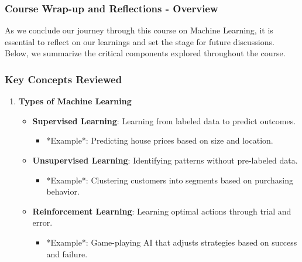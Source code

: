 \documentclass[aspectratio=169]{beamer}
\begin{document}
\frame{\titlepage}

\begin{frame}[fragile]
    \frametitle{Course Wrap-up and Reflections - Overview}
    As we conclude our journey through this course on Machine Learning,
    it is essential to reflect on our learnings and set the stage for future discussions.
    Below, we summarize the critical components explored throughout the course.
\end{frame}

\begin{frame}[fragile]
    \frametitle{Key Concepts Reviewed}
    \begin{enumerate}
        \item \textbf{Types of Machine Learning}
        \begin{itemize}
            \item \textbf{Supervised Learning}: Learning from labeled data to predict outcomes.
              \begin{itemize}
                  \item *Example*: Predicting house prices based on size and location.
              \end{itemize}
            \item \textbf{Unsupervised Learning}: Identifying patterns without pre-labeled data.
              \begin{itemize}
                  \item *Example*: Clustering customers into segments based on purchasing behavior.
              \end{itemize}
            \item \textbf{Reinforcement Learning}: Learning optimal actions through trial and error.
              \begin{itemize}
                  \item *Example*: Game-playing AI that adjusts strategies based on success and failure.
              \end{itemize}
        \end{itemize}
    \end{enumerate}
\end{frame}
\end{document}
